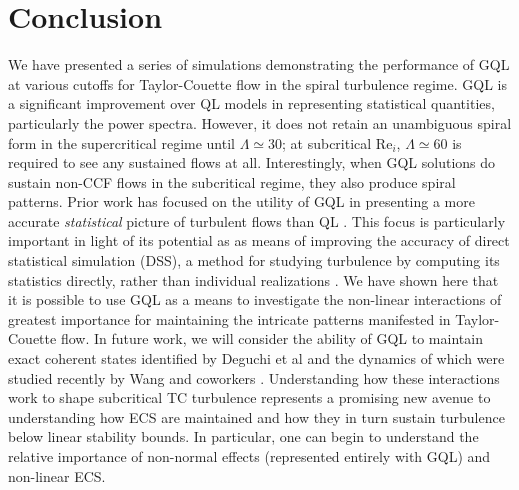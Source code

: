 \documentclass[openacc]{rstransa}%
\newcommand{\Reyn}{\mathrm{Re}}
\begin{document}
\section{Conclusion}
\label{sec:conclusion}
We have presented a series of simulations demonstrating the performance of GQL at various cutoffs for Taylor-Couette flow in the spiral turbulence regime. GQL is a significant improvement over QL models in representing statistical quantities, particularly the power spectra. However, it does not retain an unambiguous spiral form in the supercritical regime until $\Lambda \simeq 30$; at subcritical $\Reyn_i$, $\Lambda \simeq 60$ is required to see any sustained flows at all. Interestingly, when GQL solutions do sustain non-CCF flows in the subcritical regime, they also produce spiral patterns. Prior work has focused on the utility of GQL in presenting a more accurate \emph{statistical} picture of turbulent flows than QL \cite{2016PhRvL.116u4501M, 2017JFM...810..412T,2018RSPSA.47480422T,2019Kellam}. This focus is particularly important in light of its potential as as means of improving the accuracy of direct statistical simulation (DSS), a method for studying turbulence by computing its statistics directly, rather than individual realizations \cite{2022arXiv220505513M}. 
We have shown here that it is possible to use GQL as a means to investigate the non-linear interactions of greatest importance for maintaining the intricate patterns manifested in Taylor-Couette flow. In future work, we will consider the ability of GQL to maintain exact coherent states identified by Deguchi et al \cite{2014PhRvL.112r4502D} and the dynamics of which were studied recently by Wang and coworkers \cite{2022arXiv220712990W}. Understanding how these interactions work to shape subcritical TC turbulence represents a promising new avenue to understanding how ECS are maintained and how they in turn sustain turbulence below linear stability bounds. In particular, one can begin to understand the relative importance of non-normal effects (represented entirely with GQL) and non-linear ECS.


\end{document}
